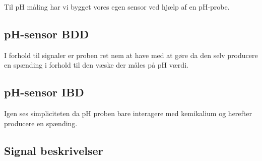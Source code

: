 
Til pH måling har vi bygget vores egen sensor ved hjælp af en pH-probe.

\subsection{pH-sensor BDD}
I forhold til signaler er proben ret nem at have med at gøre da den selv producere en spænding i forhold til den væske der måles på pH værdi.  


\subsection{pH-sensor IBD}
Igen ses simpliciteten da pH proben bare interagere med kemikalium og herefter producere en spænding.


\subsection{Signal beskrivelser}

